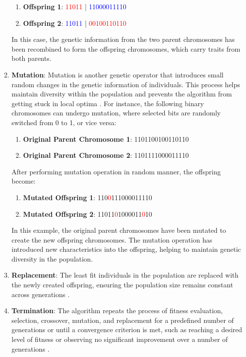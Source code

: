 \begin{enumerate}
    \begin{enumerate}
        \item \textbf{Offspring 1}: \textcolor{red}{11011} | \textcolor{blue}{11000011110}
        \item \textbf{Offspring 2}: \textcolor{blue}{11011} | \textcolor{red}{00100110110}
    \end{enumerate}
    In this case, the genetic information from the two parent chromosomes has been recombined to form the offspring chromosomes, which carry traits from both parents.
    \item \textbf{Mutation}: Mutation is another genetic operator that introduces small random changes in the genetic information of individuals. This process helps maintain diversity within the population and prevents the algorithm from getting stuck in local optima \cite{lambora2019genetic}. For instance, the following binary chromosomes can undergo mutation, where selected bits are randomly switched from 0 to 1, or vice versa:
    \begin{enumerate}
        \item \textbf{Original Parent Chromosome 1}: 1101100100110110
        \item \textbf{Original Parent Chromosome 2}: 1101111000011110
    \end{enumerate}
    After performing mutation operation in random manner, the offspring become:
    \begin{enumerate}
        \item \textbf{Mutated Offspring 1}: 110\textcolor{red}{0}111000011110
        \item \textbf{Mutated Offspring 2}: 11011\textcolor{red}{0}1000011\textcolor{red}{0}10
    \end{enumerate}
    In this example, the original parent chromosomes have been mutated to create the new offspring chromosomes. The mutation operation has introduced new characteristics into the offspring, helping to maintain genetic diversity in the population.
    \item \textbf{Replacement}: The least fit individuals in the population are replaced with the newly created offspring, ensuring the population size remains constant across generations \cite{lambora2019genetic}.
    \item \textbf{Termination}: The algorithm repeats the process of fitness evaluation, selection, crossover, mutation, and replacement for a predefined number of generations or until a convergence criterion is met, such as reaching a desired level of fitness or observing no significant improvement over a number of generations \cite{lambora2019genetic}.
\end{enumerate}

